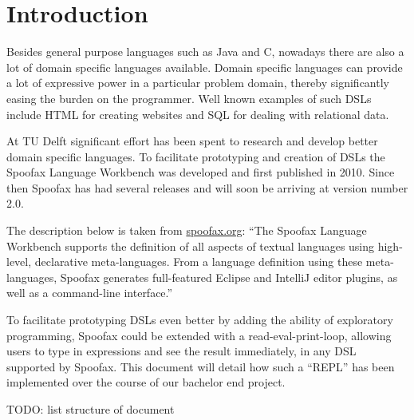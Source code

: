 \chapter{Introduction}
\label{cha:introduction}

Besides general purpose languages such as Java and C, nowadays there are also a
lot of domain specific languages available. Domain specific languages can
provide a lot of expressive power in a particular problem domain, thereby
significantly easing the burden on the programmer. Well known examples of such
DSLs include HTML for creating websites and SQL for dealing with relational
data.

At TU Delft significant effort has been spent to research and develop better
domain specific languages. To facilitate prototyping and creation of DSLs the
Spoofax Language Workbench was developed and first published in
2010\cite{Kats10a}. Since then Spoofax has had several releases and will soon
be arriving at version number 2.0.

The description below is taken from \href{http://spoofax.org}{spoofax.org}:
``The Spoofax Language Workbench supports the definition of all aspects of
textual languages using high-level, declarative meta-languages. From a
language definition using these meta-languages, Spoofax generates full-featured
Eclipse and IntelliJ editor plugins, as well as a command-line interface.''

To facilitate prototyping DSLs even better by adding the ability of exploratory
programming, Spoofax could be extended with a read-eval-print-loop, allowing
users to type in expressions and see the result immediately, in any DSL
supported by Spoofax. This document will detail how such a ``REPL'' has been
implemented over the course of our bachelor end project.

TODO: list structure of document

